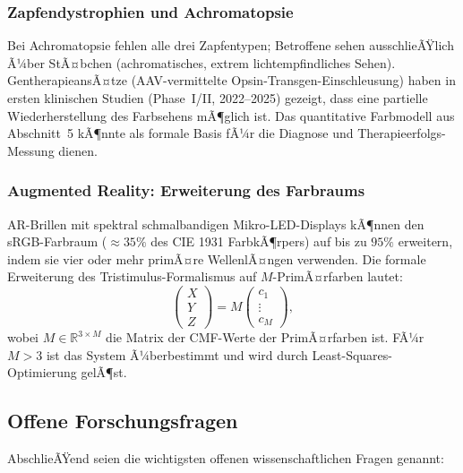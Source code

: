 ﻿\documentclass[a4paper,12pt]{article}
\theoremstyle{definition}
\begin{document}
\subsubsection{Zapfendystrophien und Achromatopsie}

Bei Achromatopsie fehlen alle drei Zapfentypen; Betroffene sehen ausschlieÃŸlich Ã¼ber
StÃ¤bchen (achromatisches, extrem lichtempfindliches Sehen). GentherapieansÃ¤tze
(AAV-vermittelte Opsin-Transgen-Einschleusung) haben in ersten klinischen Studien
(Phase~I/II, 2022--2025) gezeigt, dass eine partielle Wiederherstellung des Farbsehens
mÃ¶glich ist. Das quantitative Farbmodell aus Abschnitt~5 kÃ¶nnte als formale Basis
fÃ¼r die Diagnose und Therapieerfolgs-Messung dienen.

\subsubsection{Augmented Reality: Erweiterung des Farbraums}

AR-Brillen mit spektral schmalbandigen Mikro-LED-Displays kÃ¶nnen den sRGB-Farbraum
($\approx 35\%$ des CIE 1931 FarbkÃ¶rpers) auf bis zu $95\%$ erweitern,
indem sie vier oder mehr primÃ¤re WellenlÃ¤ngen verwenden. Die formale Erweiterung
des Tristimulus-Formalismus auf $M$-PrimÃ¤rfarben lautet:
\[
  \begin{pmatrix}X\\Y\\Z\end{pmatrix} = M \begin{pmatrix}c_1\\\vdots\\c_M\end{pmatrix},
\]
wobei $M \in \mathbb{R}^{3\times M}$ die Matrix der CMF-Werte der PrimÃ¤rfarben ist.
FÃ¼r $M > 3$ ist das System Ã¼berbestimmt und wird durch Least-Squares-Optimierung gelÃ¶st.

\subsection{Offene Forschungsfragen}

AbschlieÃŸend seien die wichtigsten offenen wissenschaftlichen Fragen genannt:
\end{document}
